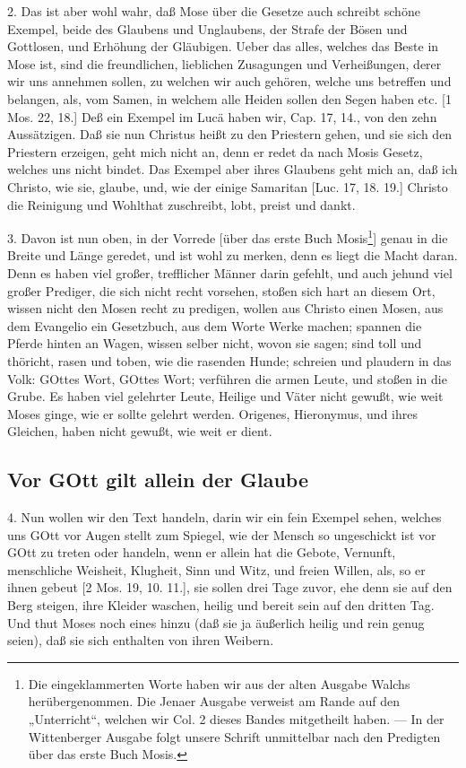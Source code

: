 2. Das ist aber wohl wahr, daß Mose über die Gesetze auch schreibt schöne Exempel, beide des Glaubens und Unglaubens, der Strafe der Bösen und Gottlosen, und Erhöhung der Gläubigen. Ueber das alles, welches das Beste in Mose ist, sind die freundlichen, lieblichen Zusagungen und Verheißungen, derer wir uns annehmen sollen, zu welchen wir auch gehören, welche uns betreffen und belangen, als, vom Samen, in welchem alle Heiden sollen den Segen haben etc. [1 Mos. 22, 18.] Deß ein Exempel im Lucä haben wir, Cap. 17, 14., von den zehn Aussätzigen. Daß sie nun Christus heißt zu den Priestern gehen, und sie sich den Priestern erzeigen, geht mich nicht an, denn er redet da nach Mosis Gesetz, welches uns nicht bindet. Das Exempel aber ihres Glaubens geht mich an, daß ich Christo, wie sie, glaube, und, wie der einige Samaritan [Luc. 17, 18. 19.] Christo die Reinigung und Wohlthat zuschreibt, lobt, preist und dankt.

3. Davon ist nun oben, in der Vorrede [über das erste Buch Mosis\footnote{Die eingeklammerten Worte haben wir aus der alten Ausgabe Walchs herübergenommen. Die Jenaer Ausgabe verweist am Rande auf den „Unterricht“, welchen wir Col. 2 dieses Bandes mitgetheilt haben. — In der Wittenberger Ausgabe folgt unsere Schrift unmittelbar nach den Predigten über das erste Buch Mosis.}] genau in die Breite und Länge geredet, und ist wohl zu merken, denn es liegt die Macht daran. Denn es haben viel großer, trefflicher Männer darin gefehlt, und auch jehund viel großer Prediger, die sich nicht recht vorsehen, stoßen sich hart an diesem Ort, wissen nicht den Mosen recht zu predigen, wollen aus Christo einen Mosen, aus dem Evangelio ein Gesetzbuch, aus dem Worte Werke machen; spannen die Pferde hinten an Wagen, wissen selber nicht, wovon sie sagen; sind toll und thöricht, rasen und toben, wie die rasenden Hunde; schreien und plaudern in das Volk: GOttes Wort, GOttes Wort; verführen die armen Leute, und stoßen in die Grube. Es haben viel gelehrter Leute, Heilige und Väter
nicht gewußt, wie weit Moses ginge, wie er sollte gelehrt werden. Origenes, Hieronymus, und ihres Gleichen, haben nicht gewußt, wie weit er dient.

\subsection{Vor GOtt gilt allein der Glaube}

4. Nun wollen wir den Text handeln, darin wir ein fein Exempel sehen, welches uns GOtt vor Augen stellt zum Spiegel, wie der Mensch so ungeschickt ist vor GOtt zu treten oder handeln, wenn er allein hat die Gebote, Vernunft, menschliche Weisheit, Klugheit, Sinn und Witz, und freien Willen, als, so er ihnen gebeut [2 Mos. 19, 10. 11.], sie sollen drei Tage zuvor, ehe denn sie auf den Berg steigen, ihre Kleider waschen, heilig und bereit sein auf den dritten Tag. Und thut Moses noch eines hinzu (daß sie ja äußerlich heilig und rein genug seien), daß sie sich enthalten von ihren Weibern.

